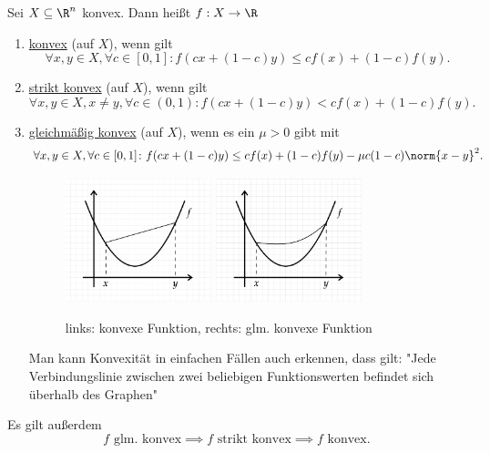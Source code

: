 \begin{definition}
\label{thm:konvexfunktion}
	Sei $X \subseteq \R^{n}$ konvex. Dann heißt $f:X \rightarrow \R$
	\begin{enumerate}[label=\alph{enumi})]
		\item \underline{konvex} (auf $X$), wenn gilt
			\[
				\forall x,y \in X, \forall c \in [0,1] \colon f(cx + (1-c)y) \leq cf(x) + (1-c)f(y)
			.\] 
		\item \underline{strikt konvex} (auf $X$), wenn gilt
			\[
				\forall x,y \in X, x \neq y, \forall c \in (0,1) \colon f(cx + (1-c)y) < cf(x) + (1-c)f(y)
			.\] 
		\item \underline{gleichmäßig konvex} (auf $X$), wenn es ein $\mu>0$ gibt mit
			\[
				\forall x,y \in X, \forall c \in [0,1] \colon f(cx+ (1-c)y) \leq cf(x) + (1-c)f(y) - \mu c(1-c) \norm{x-y}^{2}
			.\] 
			\begin{figure}[ht!]
			\begin{center}
				\includegraphics[width=0.4\textwidth]{pics/texplot1.png} 
				\includegraphics[width=0.4\textwidth]{pics/texplot2.png}
			\end{center}
			\caption{links: konvexe Funktion, rechts: glm. konvexe Funktion}
			\label{fig:glmkonvexefunktion}
			\end{figure}

			Man kann Konvexität in einfachen Fällen auch erkennen, dass gilt: "Jede Verbindungslinie zwischen zwei beliebigen Funktionswerten befindet sich überhalb des Graphen"
			
	\end{enumerate}
	Es gilt außerdem
	\[
	f \text{ glm. konvex} \implies f \text{ strikt konvex} \implies f \text{ konvex}
	.\] 
\end{definition}


